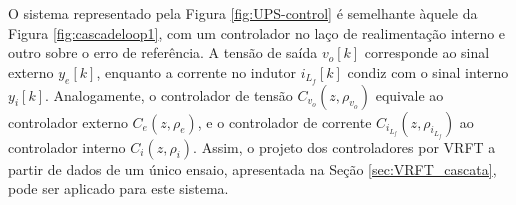 \documentclass[repeatfields,oneside]{tcc}
\newcommand{\myvo}{ {v_o} }
\newcommand{\myilf}{ {i{_{L_f}}} }
\newcommand{\myC}[2][]{ C_{#1} \left( #2 \right) }
\newcommand{\myCzrho}[1]{ \myC[#1]{z, \rho_{#1}} }
\begin{document}
O sistema representado pela Figura \ref{fig:UPS-control} é semelhante àquele da Figura \ref{fig:cascadeloop1}, com um controlador no laço de realimentação interno e outro sobre o erro de referência.
A tensão de saída $\myvo[k]$ corresponde ao sinal externo $y_e[k]$, enquanto a corrente no indutor $\myilf[k]$ condiz com o sinal interno $y_i[k]$.
Analogamente, o controlador de tensão $\myCzrho{\myvo}$ equivale ao controlador externo $\myCzrho{e}$, e o controlador de corrente $\myCzrho{\myilf}$ ao controlador interno $\myCzrho{i}$.
Assim, o projeto dos controladores por VRFT a partir de dados de um único ensaio, apresentada na Seção \ref{sec:VRFT_cascata}, pode ser aplicado para este sistema.
\end{document}
